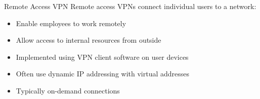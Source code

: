 \begin{concept}{Remote Access VPN}
Remote access VPNs connect individual users to a network:
\begin{itemize}
    \item Enable employees to work remotely
    \item Allow access to internal resources from outside
    \item Implemented using VPN client software on user devices
    \item Often use dynamic IP addressing with virtual addresses
    \item Typically on-demand connections
\end{itemize}
\end{concept}
